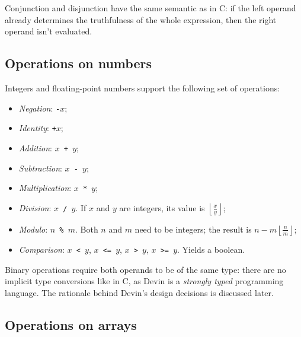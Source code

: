 \documentclass[11pt, american, draft]{PhdThesis}
\begin{document}
  Conjunction and disjunction have the same semantic as in C: if the left operand already determines
  the truthfulness of the whole expression, then the right operand isn't evaluated.

  \subsection{Operations on numbers}

  Integers and floating-point numbers support the following set of operations:

  \begin{itemize}[noitemsep,topsep=0pt]
    \item \emph{Negation}: \mbox{\texttt{-$x$}};

    \item \emph{Identity}: \mbox{\texttt{+$x$}};

    \item \emph{Addition}: \mbox{\texttt{$x$ + $y$}};

    \item \emph{Subtraction}: \mbox{\texttt{$x$ - $y$}};

    \item \emph{Multiplication}: \mbox{\texttt{$x$ * $y$}};

    \item \emph{Division}: \mbox{\texttt{$x$ / $y$}}. If $x$ and $y$ are integers, its value is
    \mbox{$\left\lfloor\frac{x}{y}\right\rfloor$};

    \item \emph{Modulo}: \mbox{\texttt{$n$ \% $m$}}. Both $n$ and $m$ need to be integers; the
    result is \mbox{$n - m \left\lfloor\frac{n}{m}\right\rfloor$};

    \item \emph{Comparison}: \mbox{\texttt{$x$ < $y$}}, \mbox{\texttt{$x$ <= $y$}},
    \mbox{\texttt{$x$ > $y$}}, \mbox{\texttt{$x$ >= $y$}}. Yields a boolean.
  \end{itemize}

  Binary operations require both operands to be of the same type: there are no implicit type
  conversions like in C, as Devin is a \emph{strongly typed} programming language. The rationale
  behind Devin's design decisions is discussed later.

  \subsection{Operations on arrays}
\end{document}
